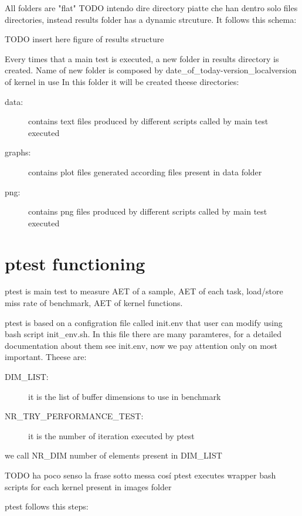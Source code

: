 \documentclass[a4paper,10pt]{article}
\begin{document}
\begin{multicols}{2}
All folders are "flat" TODO intendo dire directory piatte che han dentro solo files
directories, instead results folder has a dynamic strcuture. It follows this schema:

TODO insert here figure of results structure

Every times that a main test is executed, a new folder in results directory is created.
Name of new folder is composed by date\_of\_today-version\_localversion of kernel in use
In this folder it will be created theese directories:

\begin{description}
	\item[data:] contains text files produced by different scripts called by main test executed
	\item[graphs:] contains plot files generated according files present in data folder
	\item[png:] contains png files produced by different scripts called by main test executed
\end{description}

\section{ptest functioning}

ptest is main test to measure AET of a sample, AET of each task, load/store 
miss rate of benchmark, AET of kernel functions.

ptest is based on a configration file called init.env that user can modify using 
bash script init\_env.sh. In this file there are many paramteres, for a detailed
documentation about them see init.env, now we pay attention only on most important.
Theese are:

\begin{description}
	\item[DIM\_LIST:] it is the list of buffer dimensions to use in benchmark
	\item[NR\_TRY\_PERFORMANCE\_TEST:] it is the number of iteration executed by ptest
\end{description}

we call NR\_DIM number of elements present in DIM\_LIST

TODO ha poco senso la frase sotto messa cos\'i
ptest executes wrapper bash scripts for each kernel present in images folder

ptest follows this steps:


\end{multicols}
\end{document}

